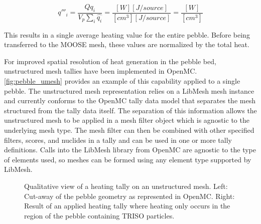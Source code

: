 \begin{equation}
    \label{eq:heat_source_normalization}
    q'''_i = \frac{Q q_i}{V_{p}\sum_{i}{\hat{q_i}}} = \frac{[W][J/source]}{[cm^{3}] [J/source]} = \frac{[W]}{[cm^{3}]}
\end{equation}

This results in a single average heating value for the entire pebble. Before being transferred to the MOOSE mesh, these values are normalized by the total heat.

For improved spatial resolution of heat generation in the pebble bed, unstructured mesh tallies have been implemented in OpenMC. \autoref{fig:pebble_umesh} provides an example of this capability applied to a single pebble. The unstructured mesh representation relies on a LibMesh mesh instance and currently conforms to the OpenMC tally data model that separates the mesh structured from the tally data itself. The separation of this information allows the unstructured mesh to be applied in a mesh filter object which is agnostic to the underlying mesh type. The mesh filter can then be combined with other specified filters, scores, and nuclides in a tally and can be used in one or more tally definitions. Calls into the LibMesh library from OpenMC are agnostic to the type of elements used, so meshes can be formed using any element type supported by LibMesh.

\begin{figure}
    \centering
    \hspace*{.2in}
    \caption{Qualitative view of a heating tally on an unstructured mesh. Left: Cut-away of the pebble geometry as represented in OpenMC. Right: Result of an applied heating tally where heating only occurs in the region of the pebble containing TRISO particles.}
    \label{fig:pebble_umesh}
\end{figure}

